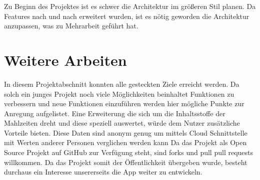 \documentclass[
    DIV12,
    cleardouble=plain,
    headings=normal,
    pdftex,
    headexclude,footexclude,
    final
]{scrreprt}
\begin{document}
Zu Beginn des Projektes ist es schwer die Architektur im größeren Stil planen. Da Features nach und nach erweitert wurden, ist es nötig geworden die Architektur anzupassen, was zu Mehrarbeit geführt hat.


\newpage

\chapter{Weitere Arbeiten}
In diesem Projektabschnitt konnten alle gesteckten Ziele erreicht werden. Da solch ein junges Projekt noch viele Möglichkeiten beinhaltet Funktionen zu verbessern und neue Funktionen einzuführen werden hier mögliche Punkte zur Anregung aufgelistet. 
Eine Erweiterung die sich um die Inhaltsstoffe der Mahlzeiten dreht und diese speziell auswertet, würde dem Nutzer zusätzliche Vorteile bieten. Diese Daten sind anonym genug um mittels Cloud Schnittstelle mit Werten anderer Personen verglichen werden kann
Da das Projekt als Open Source Projekt auf GitHub zur Verfügung steht, sind forks und pull pull requests willkommen. Da das Projekt somit der Öffentlichkeit übergeben wurde, besteht durchaus ein Interesse unsererseits die App weiter zu entwickeln.





\newpage


\listoffigures
\end{document}
